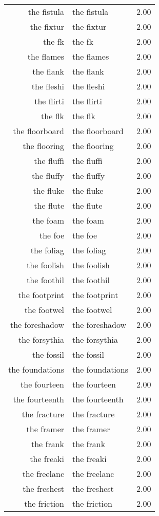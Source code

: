 \begin{table}[ht]
\begin{tabular}{rlr}
  the fistula & the fistula & 2.00 \\ 
  the fixtur & the fixtur & 2.00 \\ 
  the fk & the fk & 2.00 \\ 
  the flames & the flames & 2.00 \\ 
  the flank & the flank & 2.00 \\ 
  the fleshi & the fleshi & 2.00 \\ 
  the flirti & the flirti & 2.00 \\ 
  the flk & the flk & 2.00 \\ 
  the floorboard & the floorboard & 2.00 \\ 
  the flooring & the flooring & 2.00 \\ 
  the fluffi & the fluffi & 2.00 \\ 
  the fluffy & the fluffy & 2.00 \\ 
  the fluke & the fluke & 2.00 \\ 
  the flute & the flute & 2.00 \\ 
  the foam & the foam & 2.00 \\ 
  the foe & the foe & 2.00 \\ 
  the foliag & the foliag & 2.00 \\ 
  the foolish & the foolish & 2.00 \\ 
  the foothil & the foothil & 2.00 \\ 
  the footprint & the footprint & 2.00 \\ 
  the footwel & the footwel & 2.00 \\ 
  the foreshadow & the foreshadow & 2.00 \\ 
  the forsythia & the forsythia & 2.00 \\ 
  the fossil & the fossil & 2.00 \\ 
  the foundations & the foundations & 2.00 \\ 
  the fourteen & the fourteen & 2.00 \\ 
  the fourteenth & the fourteenth & 2.00 \\ 
  the fracture & the fracture & 2.00 \\ 
  the framer & the framer & 2.00 \\ 
  the frank & the frank & 2.00 \\ 
  the freaki & the freaki & 2.00 \\ 
  the freelanc & the freelanc & 2.00 \\ 
  the freshest & the freshest & 2.00 \\ 
  the friction & the friction & 2.00 \\ 

\end{tabular}
\end{table}
